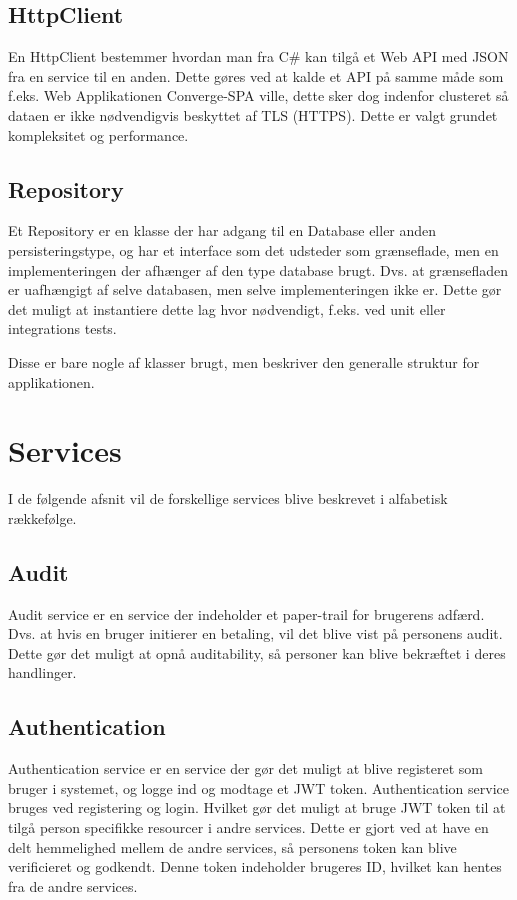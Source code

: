 \subsection{HttpClient}

En HttpClient bestemmer hvordan man fra C# kan tilgå et Web API med JSON fra en service til en anden. Dette gøres ved at kalde et API på samme måde som f.eks. Web Applikationen Converge-SPA ville, dette sker dog indenfor clusteret så dataen er ikke nødvendigvis beskyttet af TLS (HTTPS). Dette er valgt grundet kompleksitet og performance.

\subsection{Repository}

Et Repository er en klasse der har adgang til en Database eller anden persisteringstype, og har et interface som det udsteder som grænseflade, men en implementeringen der afhænger af den type database brugt. Dvs. at grænsefladen er uafhængigt af selve databasen, men selve implementeringen ikke er. Dette gør det muligt at instantiere dette lag hvor nødvendigt, f.eks. ved unit eller integrations tests.


Disse er bare nogle af klasser brugt, men beskriver den generalle struktur for applikationen. 

\section{Services}

I de følgende afsnit vil de forskellige services blive beskrevet i alfabetisk rækkefølge.

\subsection{Audit}
\label{sec:audit-service}

Audit service er en service der indeholder et paper-trail for brugerens adfærd. Dvs. at hvis en bruger initierer en betaling, vil det blive vist på personens audit. Dette gør det muligt at opnå auditability, så personer kan blive bekræftet i deres handlinger.

\subsection{Authentication}
\label{sec:authentication-service}

Authentication service er en service der gør det muligt at blive registeret som bruger i systemet, og logge ind og modtage et JWT token. Authentication service bruges ved registering og login. Hvilket gør det muligt at bruge JWT token til at tilgå person specifikke resourcer i andre services. Dette er gjort ved at have en delt hemmelighed mellem de andre services, så personens token kan blive verificieret og godkendt. Denne token indeholder brugeres ID, hvilket kan hentes fra de andre services.

